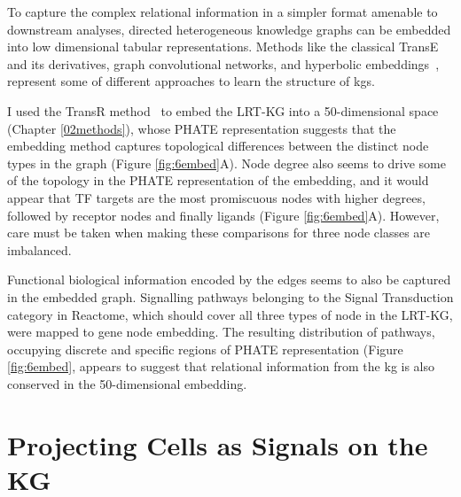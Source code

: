 To capture the complex relational information in a simpler format amenable to downstream analyses, directed heterogeneous knowledge graphs can be embedded into low dimensional tabular representations. Methods like the classical TransE~\cite{bordes_translating_2013} and its derivatives, graph convolutional networks, and hyperbolic embeddings~\cite{chami_hyperbolic_2019}, represent some of different approaches to learn the structure of \acrshort{kg}s.

I used the TransR method~\cite{zhang_transr_2021} to embed the LRT-KG into a 50-dimensional space (Chapter \ref{02methods}), whose PHATE representation suggests that the embedding method captures topological differences between the distinct node types in the graph (Figure \ref{fig:6embed}A). Node degree also seems to drive some of the topology in the PHATE representation of the embedding, and it would appear that TF targets are the most promiscuous nodes with higher degrees, followed by receptor nodes and finally ligands (Figure \ref{fig:6embed}A). However, care must be taken when making these comparisons for three node classes are imbalanced.

Functional biological information encoded by the edges seems to also be captured in the embedded graph. Signalling pathways belonging to the Signal Transduction category in Reactome, which should cover all three types of node in the LRT-KG, were mapped to gene node embedding. The resulting distribution of pathways, occupying discrete and specific regions of PHATE representation (Figure \ref{fig:6embed}, appears to suggest that relational information from the \acrshort{kg} is also conserved in the 50-dimensional embedding.


\section{Projecting Cells as Signals on the KG}

